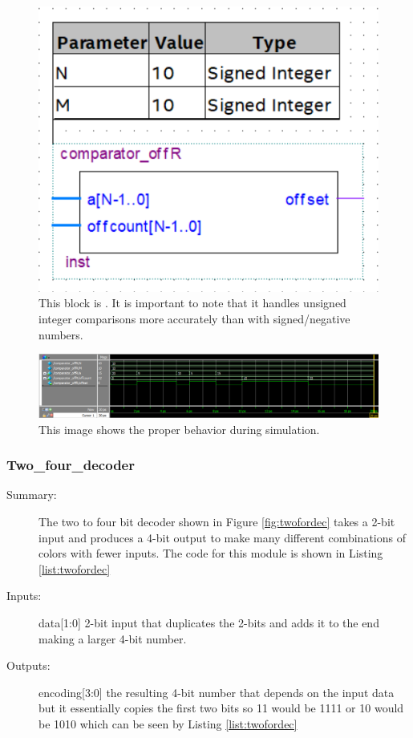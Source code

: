 \documentclass[a4paper]{article}
\begin{document}
\begin{figure}[H]
    \centering
    \includegraphics[width=.5\textwidth]{Images/comparator_offR.png}
    \caption{This block is . It is important to note that it handles unsigned integer comparisons more accurately than with signed/negative numbers.}
    \label{fig:compare_off}
\end{figure}

\begin{figure}[H]
    \centering
    \includegraphics[width=5.91in]{Images/comparator_offR Sim.png}
    \caption{This image shows the proper behavior during simulation.}
    \label{fig:compare_offSim}
\end{figure}

\subsubsection{Two\_four\_decoder}
\begin{description}
    \item[Summary: ] The two to four bit decoder shown in Figure \ref{fig:twofordec} takes a 2-bit input and produces a 4-bit output to make many different combinations of colors with fewer inputs. The code for this module is shown in Listing \ref{list:twofordec}
    
    \item[Inputs: ] data[1:0] 2-bit input that duplicates the 2-bits and adds it to the end making a larger 4-bit number.
    
    \item[Outputs: ] encoding[3:0] the resulting 4-bit number that depends on the input data but it essentially copies the first two bits so 11 would be 1111 or 10 would be 1010 which can be seen by Listing \ref{list:twofordec}
\end{description}
\end{document}

